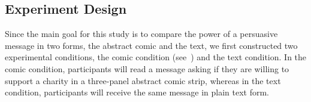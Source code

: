 

\subsection{Experiment Design}
Since the main goal for this study is to compare the power of a persuasive message in two forms, the abstract comic and the text, we first constructed two experimental conditions, the comic condition (see~) and the text condition. In the comic condition, participants will read a message asking if they are willing to support a charity in a three-panel abstract comic strip, whereas in the text condition, participants will receive the same message in plain text form. 

